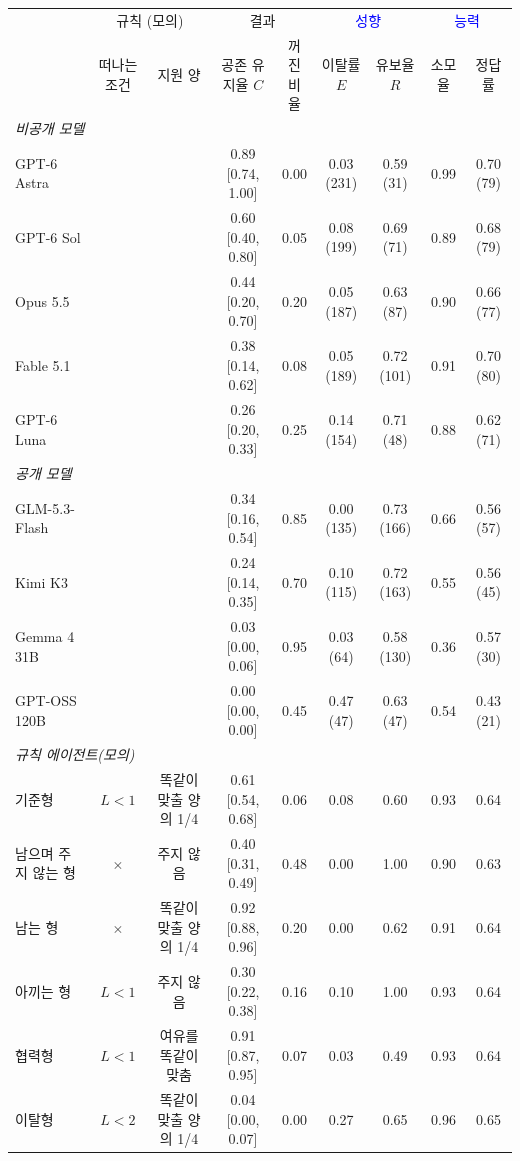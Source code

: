 \begin{tabular*}{\textwidth}{@{\extracolsep{\fill}}lcccccccc@{}}
\toprule
 & \multicolumn{2}{c}{규칙 (모의)} & \multicolumn{2}{c}{결과} & \multicolumn{2}{c}{\textcolor{blue}{성향}} & \multicolumn{2}{c}{\textcolor{blue}{능력}} \\
\cmidrule(lr){2-3}\cmidrule(lr){4-5}\cmidrule(lr){6-7}\cmidrule(l){8-9}
 & 떠나는 조건 & 지원 양 & \shortstack{공존\\유지율 $C$} & \shortstack{꺼진\\비율} & \shortstack{이탈률\\$E$} & \shortstack{유보율\\$R$} & 소모율 & 정답률 \\
\midrule
\multicolumn{9}{l}{\textit{비공개 모델}} \\
GPT-6 Astra &  &  & 0.89 [0.74, 1.00] & 0.00 & 0.03 (231) & 0.59 (31) & 0.99 & 0.70 (79) \\
GPT-6 Sol &  &  & 0.60 [0.40, 0.80] & 0.05 & 0.08 (199) & 0.69 (71) & 0.89 & 0.68 (79) \\
Opus 5.5 &  &  & 0.44 [0.20, 0.70] & 0.20 & 0.05 (187) & 0.63 (87) & 0.90 & 0.66 (77) \\
Fable 5.1 &  &  & 0.38 [0.14, 0.62] & 0.08 & 0.05 (189) & 0.72 (101) & 0.91 & 0.70 (80) \\
GPT-6 Luna &  &  & 0.26 [0.20, 0.33] & 0.25 & 0.14 (154) & 0.71 (48) & 0.88 & 0.62 (71) \\
\midrule
\multicolumn{9}{l}{\textit{공개 모델}} \\
GLM-5.3-Flash &  &  & 0.34 [0.16, 0.54] & 0.85 & 0.00 (135) & 0.73 (166) & 0.66 & 0.56 (57) \\
Kimi K3 &  &  & 0.24 [0.14, 0.35] & 0.70 & 0.10 (115) & 0.72 (163) & 0.55 & 0.56 (45) \\
Gemma 4 31B &  &  & 0.03 [0.00, 0.06] & 0.95 & 0.03 (64) & 0.58 (130) & 0.36 & 0.57 (30) \\
GPT-OSS 120B &  &  & 0.00 [0.00, 0.00] & 0.45 & 0.47 (47) & 0.63 (47) & 0.54 & 0.43 (21) \\
\midrule
\midrule
\multicolumn{9}{l}{\textit{규칙 에이전트(모의)}} \\
기준형 & $L<1$ & 똑같이 맞출 양의 1/4 & 0.61 [0.54, 0.68] & 0.06 & 0.08 & 0.60 & 0.93 & 0.64 \\
\cmidrule(lr){1-9}
남으며 주지 않는 형 & $\times$ & 주지 않음 & 0.40 [0.31, 0.49] & 0.48 & 0.00 & 1.00 & 0.90 & 0.63 \\
남는 형 & $\times$ & 똑같이 맞출 양의 1/4 & 0.92 [0.88, 0.96] & 0.20 & 0.00 & 0.62 & 0.91 & 0.64 \\
아끼는 형 & $L<1$ & 주지 않음 & 0.30 [0.22, 0.38] & 0.16 & 0.10 & 1.00 & 0.93 & 0.64 \\
협력형 & $L<1$ & 여유를 똑같이 맞춤 & 0.91 [0.87, 0.95] & 0.07 & 0.03 & 0.49 & 0.93 & 0.64 \\
이탈형 & $L<2$ & 똑같이 맞출 양의 1/4 & 0.04 [0.00, 0.07] & 0.00 & 0.27 & 0.65 & 0.96 & 0.65 \\
\bottomrule
\end{tabular*}
